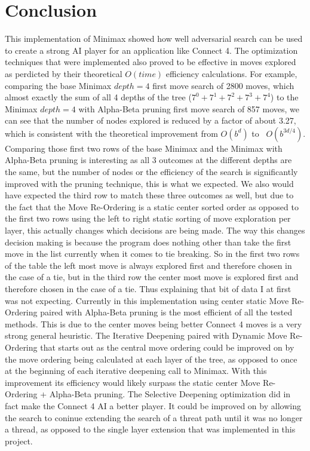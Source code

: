 \documentclass[conference]{IEEEtran}
\begin{document}
\section*{Conclusion}
This implementation of Minimax showed how well adversarial search can be used to create a strong AI player for an application like Connect 4. The optimization techniques that were implemented also proved to be effective in moves explored as perdicted by their theoretical $O(time)$ efficiency calculations. For example, comparing the base Minimax $depth = 4$ first move search of 2800 moves, which almost exactly the sum of all 4 depths of the tree ($7^0 + 7^1 +7^2 +7^3 + 7^4$) to the Minimax $depth = 4$ with Alpha-Beta pruning first move search of 857 moves, we can see that the number of nodes explored is reduced by a factor of about 3.27, which is consistent with the theoretical improvement from $O(b^d)$ to ~$O(b^{3d/4})$. Comparing those first two rows of the base Minimax and the Minimax with Alpha-Beta pruning is interesting as all 3 outcomes at the different depths are the same, but the number of nodes or the efficiency of the search is significantly improved with the pruning technique, this is what we expected. We also would have expected the third row to match these three outcomes as well, but due to the fact that the Move Re-Ordering is a static center sorted order as opposed to the first two rows using the left to right static sorting of move exploration per layer, this actually changes which decisions are being made. The way this changes decision making is because the program does nothing other than take the first move in the list currently when it comes to tie breaking. So in the first two rows of the table the left most move is always explored first and therefore chosen in the case of a tie, but in the third row the center most move is explored first and therefore chosen in the case of a tie. Thus explaining that bit of data I at first was not expecting. Currently in this implementation using center static Move Re-Ordering paired with Alpha-Beta pruning is the most efficient of all the tested methods. This is due to the center moves being better Connect 4 moves is a very strong general heuristic. The Iterative Deepening paired with Dynamic Move Re-Ordering that starts out as the central move ordering could be improved on by the move ordering being calculated at each layer of the tree, as opposed to once at the beginning of each iterative deepening call to Minimax. With this improvement its efficiency would likely surpass the static center Move Re-Ordering + Alpha-Beta pruning. The Selective Deepening optimization did in fact make the Connect 4 AI a better player. It could be improved on by allowing the search to coninue extending the search of a threat path until it was no longer a thread, as opposed to the single layer extension that was implemented in this project.
\end{document}
